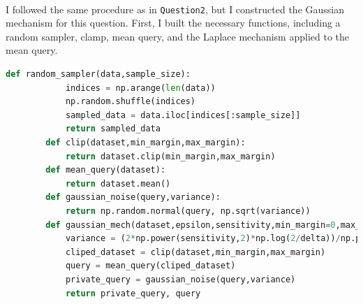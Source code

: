 \documentclass[12pt]{extarticle}
\begin{document}
	 \\
	 I followed the same procedure as in \texttt{Question2}, but I constructed the Gaussian mechanism for this question. First, I built the necessary functions, including a random sampler, clamp, mean query, and the Laplace mechanism applied to the mean query.
	 \begin{lstlisting}[language=Python]	
	 	def random_sampler(data,sample_size):
		 	indices = np.arange(len(data))
		 	np.random.shuffle(indices)
		 	sampled_data = data.iloc[indices[:sample_size]]
		 	return sampled_data
	 	def clip(dataset,min_margin,max_margin):
	 		return dataset.clip(min_margin,max_margin)
	 	def mean_query(dataset):
	 		return dataset.mean()
	 	def gaussian_noise(query,variance):
	 		return np.random.normal(query, np.sqrt(variance))
	 	def gaussian_mech(dataset,epsilon,sensitivity,min_margin=0,max_margin=20,delta=1e-8):
		 	variance = (2*np.power(sensitivity,2)*np.log(2/delta))/np.power(epsilon,2)
		 	cliped_dataset = clip(dataset,min_margin,max_margin)
		 	query = mean_query(cliped_dataset)
		 	private_query = gaussian_noise(query,variance)
		 	return private_query, query
	 \end{lstlisting}
\end{document}
